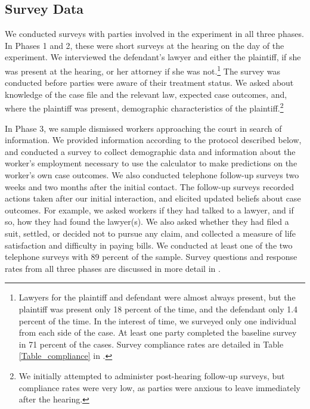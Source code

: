 \documentclass[11pt, a4paper]{article}
\begin{document}
\subsection{Survey Data}

We conducted surveys with parties involved in the experiment in all three phases. In Phases 1 and 2, these were short surveys at the hearing on the day of the experiment. We interviewed the defendant's lawyer and either the plaintiff, if she was present at the hearing, or her attorney if she was not.\footnote{Lawyers for the plaintiff and defendant were almost always present, but the plaintiff was present only 18 percent of the time, and the defendant only 1.4 percent of the time. In the interest of time, we surveyed only one individual from each side of the case. At least one party completed the baseline survey in 71 percent of the cases. Survey compliance rates are detailed in Table \ref{Table_compliance} in .} The survey was conducted before parties were aware of their treatment status. We asked about knowledge of the case file and the relevant law, expected case outcomes, and, where the plaintiff was present, demographic characteristics of the plaintiff.\footnote{We initially attempted to administer post-hearing follow-up surveys, but compliance rates were very low, as parties were anxious to leave immediately after the hearing.}

In Phase 3, we sample dismissed workers approaching the court in search of information. We provided information according to the protocol described below, and conducted a survey to collect demographic data and information about the worker's employment necessary to use the calculator to make predictions on the worker's own case outcomes. We also conducted telephone follow-up surveys two weeks and two months after the initial contact. The follow-up surveys recorded actions taken after our initial interaction, and elicited updated beliefs about case outcomes. For example, we asked workers if they had talked to a lawyer, and if so, how they had found the lawyer(s). We also asked whether they had filed a suit, settled, or decided not to pursue any claim, and collected a measure of life satisfaction and difficulty in paying bills. We conducted at least one of the two telephone surveys with 89 percent of the sample. Survey questions and response rates from all three phases are discussed in more detail in . 
\end{document}
